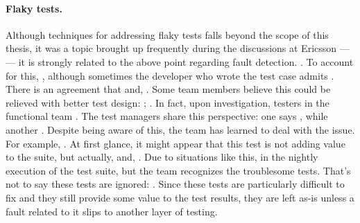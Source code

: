 \paragraph{Flaky tests.} Although techniques for addressing flaky tests falls beyond the scope of this thesis, it was a topic brought up frequently during the discussions at Ericsson —  — it is strongly related to the above point regarding fault detection.
.
To account for this, , although sometimes the developer who wrote the test case admits .
There is an agreement that  and, .
Some team members believe this could be relieved with better test design: ; .
In fact, upon investigation, testers in the functional team .
The test managers share this perspective: one says , while another .
Despite being aware of this, the team has learned to deal with the issue.
For example, .
At first glance, it might appear that this test is not adding value to the suite, but actually,  and, .
Due to situations like this,  in the nightly execution of the test suite, but the team recognizes the troublesome tests.
That's not to say these tests are ignored: .
Since these tests are particularly difficult to fix and they still provide some value to the test results, they are left as-is unless a fault related to it slips to another layer of testing.

